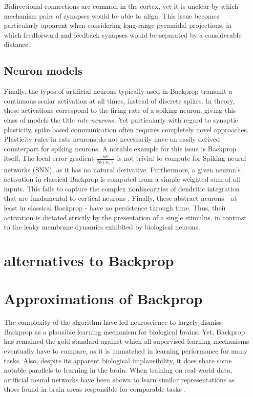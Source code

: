 Bidirectional connections are common in the cortex, yet it is unclear by which mechanism pairs of synapses would be able
to align. This issue becomes particularly apparent when considering long-range pyramidal projections, in which
feedforward and feedback synapses would be separated by a considerable distance.

\subsection{Neuron models}

Finally, the types of artificial neurons typically used in Backprop transmit a continuous scalar activation at all
times, instead of discrete spikes. In theory, these activations correspond to the firing rate of a spiking neuron,
giving this class of models the title \textit{rate neurons}. Yet particularly with regard to synaptic plasticity, spike
based communication often requires completely novel approaches. Plasticity rules in rate neurons do not necessarily have
an easily derived counterpart for spiking neurons. A notable example for this issue is Backprop itself; The local error
gradient $\frac{\delta E}{\delta \phi(u_i)}$ is not trivial to compute for Spiking neural networks (SNN), as it has no
natural derivative. Furthermore, a given neuron's activation in classical Backprop is computed from a simple weighted
sum of all inputs. This fails to capture the complex nonlinearities of dendritic integration that are fundamental to
cortical neurons \citep{Gerstner2009,sjostrom2008dendritic,Eyal2018}. Finally, these abstract neurons - at least in
classical Backprop - have no persistence through time. Thus, their activation is dictated strictly by the presentation
of a single stimulus, in contrast to the leaky membrane dynamics exhibited by biological neurons.


\section{alternatives to Backprop}


\section{Approximations of Backprop}

The complexity of the algorithm have led neuroscience to largely dismiss Backprop as a plausible learning mechanism for
biological brains. Yet, Backprop has remained the gold standard against which all supervised learning mechanisms
eventually have to compare, as it is unmatched in learning performance for many tasks. Also, despite its apparent
biological implausibility, it does share some notable parallels to learning in the brain: When training on real-world
data, artificial neural networks have been shown to learn similar representations as those found in brain areas
responsible for comparable tasks \cite{whittington2019theories,Yamins2016}. 

